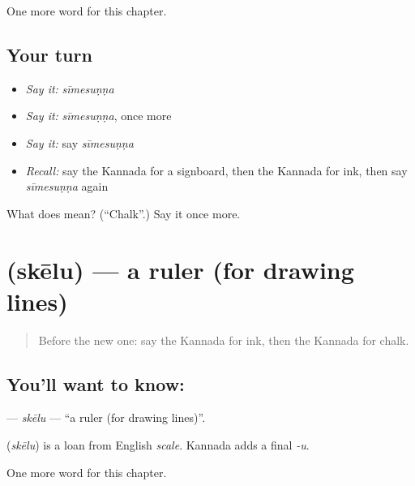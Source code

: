 \begin{grammarlens}[title={What you've built}]
One more word for this chapter.
\end{grammarlens}

\subsection*{Your turn}
\begin{itemize}
\raggedright
  \item \emph{Say it:} \emph{sīmesuṇṇa}
  \item \emph{Say it:} \emph{sīmesuṇṇa}, once more
  \item \emph{Say it:} say \emph{sīmesuṇṇa}
  \item \emph{Recall:} say the Kannada for a signboard, then the Kannada for ink, then say \emph{sīmesuṇṇa} again
\end{itemize}

\begin{tcolorbox}[breakable,colback=teal!4,colframe=teal!35!black,title={Before you move on}]
What does  mean? (\textquotedblleft{}Chalk\textquotedblright{}.) Say it once more.
\end{tcolorbox}
\section[\texorpdfstring{\kn{ಸ್ಕೇಲು} (skēlu)}{ಸ್ಕೇಲು (skēlu)}]{ (skēlu) — a ruler (for drawing lines)}

\label{lesson:KA-C307-skelu}



\begin{quote}
Before the new one: say the Kannada for ink, then the Kannada for chalk.
\end{quote}

\subsection*{You'll want to know: }
\textbf{} — \emph{skēlu} — \textquotedblleft{}a ruler (for drawing lines)\textquotedblright{}.

\begin{cousinweb}
\textbf{} (\emph{skēlu}) is a loan from English \emph{scale}. Kannada adds a final \emph{-u}.
\end{cousinweb}

\begin{grammarlens}[title={What you've built}]
One more word for this chapter.
\end{grammarlens}

